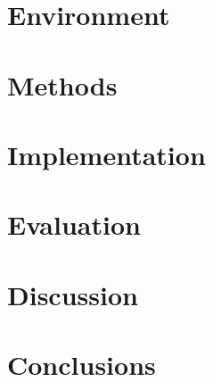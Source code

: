 \documentclass[12pt,a4paper,oneside,pdftex]{report}
\begin{document}






% 

\chapter{Environment}
\label{chapter:environment}


% 

\chapter{Methods}
\label{chapter:methods}

% 

\chapter{Implementation}
\label{chapter:implementation}

% 

\chapter{Evaluation}
\label{chapter:evaluation}

% 

\chapter{Discussion}
\label{chapter:discussion}

% 

\chapter{Conclusions}
\label{chapter:conclusions}

% 

\end{document}
